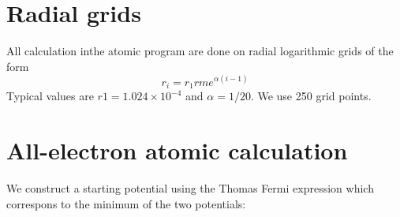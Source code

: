 \section{Radial grids}
All calculation inthe atomic program are done on radial logarithmic
grids of the form
\begin{equation}
r_i=r_1{rm e}^{\alpha(i-1)}
\end{equation}
Typical values are $r1=1.024\times10^{-4}$ and $\alpha=1/20$. We use
250 grid points.



\section{All-electron atomic calculation}
We construct a starting potential using the Thomas Fermi expression
which correspons to the minimum of the two potentials:
